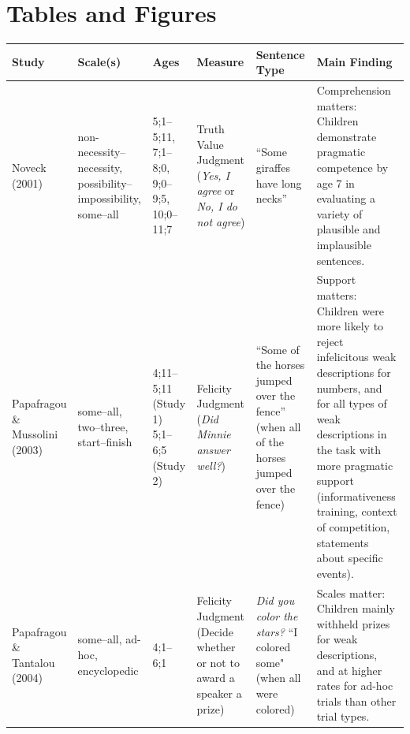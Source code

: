 \documentclass[man]{apa2}
\begin{document}
{\section{Tables and Figures}

\begin{landscape}
\begin{table}[!ht]
\footnotesize
\centering
\begin{tabular}{| p{2.2cm} | p{2cm} | p{1.69cm} | p{4.5cm} | p{5cm} | p{7.2cm} |} \hline
{\bf Study} & {\bf Scale(s)} & {\bf Ages} & {\bf Measure} & {\bf Sentence Type} & {\bf Main Finding} \\ \hline
Noveck (2001) & non-necessity--necessity, possibility--impossibility, some--all & 5;1--5;11, 7;1--8;0, 9;0--9;5, 10;0--11;7 & Truth Value Judgment (\textit{Yes, I agree} or \textit{No, I do not agree}) & ``Some giraffes have long necks'' & \parbox[t]{7.2cm}{Comprehension matters: Children demonstrate\\ pragmatic competence by age 7 in evaluating a variety of plausible and implausible sentences.} \\ \hline
\parbox[t]{2.2cm}{Papafragou \&\\Mussolini (2003)} & \parbox[t]{2cm}{some--all,\\two--three,\\start--finish} & \parbox[t]{1.69cm}{4;11--5;11\\(Study 1)\\5;1--6;5\\(Study 2) } &  \parbox[t]{4.5cm}{Felicity Judgment (\textit{Did Minnie\\answer well?})} & ``Some of the horses jumped over the fence'' (when all of the horses jumped over the fence) & Support matters: Children were more likely to reject infelicitous weak descriptions for numbers, and for all types of weak descriptions in the task with more pragmatic support (informativeness training, context of competition, statements about specific events). \\ \hline
\parbox[t]{2.2cm}{Papafragou \&\\Tantalou (2004)} & some--all, ad-hoc, encyclopedic & 4;1--6;1 & Felicity Judgment (Decide whether or not to award a speaker a prize) & \textit{Did you color the stars?} ``I colored some" (when all were colored) & Scales matter: Children mainly withheld prizes for weak descriptions, and at higher rates for ad-hoc trials than other trial types. \\ \hline

\end{tabular}
\end{table}
\end{landscape}}
\end{document}
